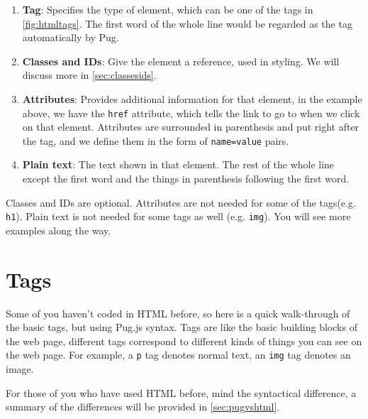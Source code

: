 \begin{enumerate}
    \item \textbf{Tag}: Specifies the type of element, which can be one of the tags in \cref{fig:htmltags}. The first word of the whole line would be regarded as the tag automatically by Pug.
    \item \textbf{Classes and IDs}: Give the element a reference, used in styling. We will discuss more in \cref{sec:classesids}.
    \item \textbf{Attributes}: Provides additional information for that element, in the example above, we have the \texttt{href} attribute, which tells the link to go to when we click on that element. Attributes are surrounded in parenthesis and put right after the tag, and we define them in the form of \texttt{name=value} pairs.
    \item \textbf{Plain text}: The text shown in that element. The rest of the whole line except the first word and the things in parenthesis following the first word.
\end{enumerate}

Classes and IDs are optional. Attributes are not needed for some of the tags(e.g. \texttt{h1}). Plain text is not needed for some tags as well (e.g. \texttt{img}). You will see more examples along the way.

\section{Tags}

Some of you haven't coded in HTML before, so here is a quick walk-through of the basic tags, but using Pug.js syntax. Tags are like the basic building blocks of the web page, different tags correspond to different kinds of things you can see on the web page. For example, a \texttt{p} tag denotes normal text, an \texttt{img} tag denotes an image. 
\vspace{6mm}

For those of you who have used HTML before, mind the syntactical difference, a summary of the differences will be provided in \cref{sec:pugvshtml}. 

\pagebreak

